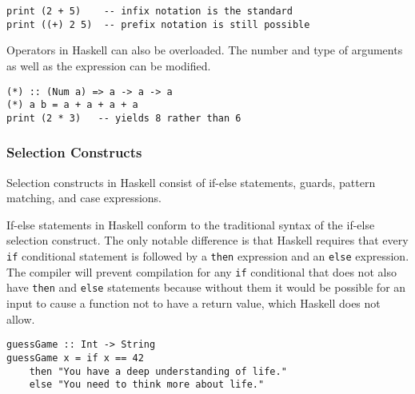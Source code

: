 \documentclass[titlepage,12pt]{article}
\begin{document}
\begin{verbatim}
print (2 + 5)    -- infix notation is the standard
print ((+) 2 5)  -- prefix notation is still possible
\end{verbatim}

Operators in Haskell can also be overloaded. The number and type of arguments as well as the expression can be modified. 

\begin{verbatim}
(*) :: (Num a) => a -> a -> a
(*) a b = a + a + a + a
print (2 * 3)   -- yields 8 rather than 6
\end{verbatim}

\subsubsection{Selection Constructs}

Selection constructs in Haskell consist of if-else statements, guards, pattern matching, and case expressions. 

If-else statements in Haskell conform to the traditional syntax of the if-else selection construct. The only notable 
difference is that Haskell requires that every \texttt{if} conditional statement is followed by a \texttt{then} expression and an \texttt{else} expression. 
The compiler will prevent compilation for any \texttt{if} conditional that does not also have \texttt{then} and \texttt{else} statements because 
without them it would be possible for an input to cause a function not to have a return value, which Haskell does not allow.

\begin{verbatim}
guessGame :: Int -> String
guessGame x = if x == 42
    then "You have a deep understanding of life."
    else "You need to think more about life."
\end{verbatim}
\end{document}
